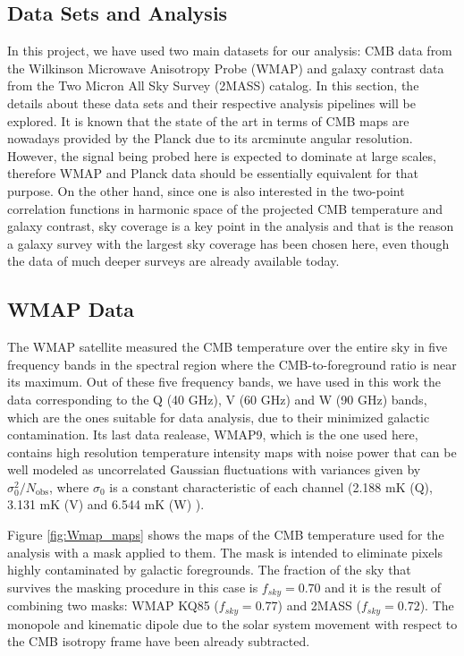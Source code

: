 \documentclass[openany,a4paper,12pt,oneside]{book}
\begin{document}
\begin{spacing}{1.5}
\section{Data Sets and Analysis}

In this project, we have used two main datasets for our analysis: CMB data from the Wilkinson Microwave Anisotropy Probe (WMAP)\cite{WMAP_results,WMAP_data} and galaxy contrast data from the Two Micron All Sky Survey (2MASS) catalog\cite{2MASS}. In this section, the details about these data sets and their respective analysis pipelines will be explored. It is known that the state of the art in terms of CMB maps are nowadays provided by the Planck due to its arcminute angular resolution. However, the signal being probed here is expected to dominate at large scales, therefore WMAP and Planck data should be essentially equivalent for that purpose. On the other hand, since one is also interested in the two-point correlation functions in harmonic space of the projected CMB temperature and galaxy contrast, sky coverage is a key point in the analysis and that is the reason a galaxy survey with the largest sky coverage has been chosen here, even though the data of much deeper surveys are already available today.



\subsection{WMAP Data}

The WMAP satellite measured the CMB temperature over the entire sky in five frequency bands in the spectral region where the
CMB-to-foreground ratio is near its maximum\cite{WMAP_data}. Out of these five frequency bands, we have used in this work the data corresponding to the Q (40 GHz), V (60 GHz) and W (90 GHz) bands, which are the ones suitable for data analysis, due to their minimized galactic contamination. Its last data realease, WMAP9, which is the one used here, contains high resolution temperature intensity maps with noise power that can be well modeled as uncorrelated Gaussian fluctuations with variances given by $\sigma_0^2/N_\text{obs}$, where $\sigma_0$ is a constant characteristic of each channel (2.188 mK (Q), 3.131 mK (V) and 6.544 mK (W) \cite{wmap_supplement}).

Figure \ref{fig:Wmap_maps} shows the maps of the CMB temperature used for the analysis with a mask applied to them. The mask is intended to eliminate pixels highly contaminated by galactic foregrounds. The fraction of the sky that survives the masking procedure in this case is $f_{sky}=0.70$ and it is the result of combining two masks: WMAP KQ85 ($f_{sky}=0.77$) and 2MASS ($f_{sky}=0.72$). The monopole \cite{CMB_temperature:Fixsen_2009} and kinematic dipole due to the solar system movement with respect to the CMB isotropy frame have been already subtracted.


\end{spacing}
\end{document}
